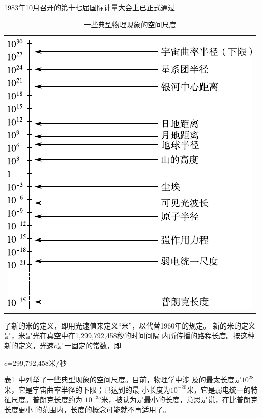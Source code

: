 \renewcommand{\hsp}{\hspace{0.6em}}
1983\hsp 年\hsp 10\hsp 月召开的第十七届国际计量大会上已正式通过
\\
\begin{table}[!h]
    \centering
    \vspace{-0.5em}
    \caption{一些典型物理现象的空间尺度}
    \label{tab:01.03}
    \begin{tabular}{c}
        \toprule \vspace{-1em}                \\
        \includegraphics{figure/tab01.03.pdf} \\
        \bottomrule
    \end{tabular}
    \vspace{-1.2em}
\end{table}
\clearpage

\noindent 了新的米的定义，即用光速值来定义“米”，以代替1960年的规定。
新的米的定义是，米是光在真空中在1,299,792,458秒的时间间隔
内所传播的路程长度。按这种新的定义，光速c是一固定的常数，即

\centerline{$c$=299,792,458米/秒}

表\ref{tab:01.03}~中列举了一些典型现象的空间尺度。目前，物理学中涉
及的最太长度是$10^{28}$米，它是宇宙曲率半径的下限；已达到的最
小长度为$10^{-20}$米，它是弱电统一的特征尺度。普朗克长度约为
$10^{-35}$米，被认为是最小的长度，意思是说，在比普朗克长度更小
的范围内，长度的概念可能就不再适用了。
